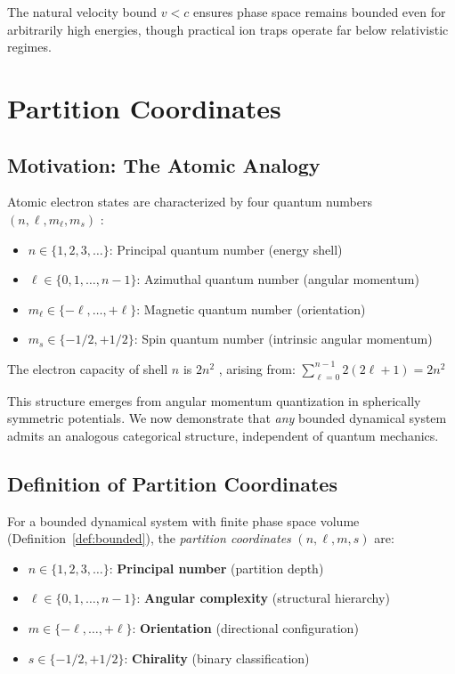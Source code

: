 The natural velocity bound $v < c$ ensures phase space remains bounded even for arbitrarily high energies, though practical ion traps operate far below relativistic regimes.

\section{Partition Coordinates}
\label{sec:coordinates}

\subsection{Motivation: The Atomic Analogy}

Atomic electron states are characterized by four quantum numbers $(n, \ell, m_\ell, m_s)$ \citep{dirac1981principles,sakurai2017modern}:
\begin{itemize}
    \item $n \in \{1, 2, 3, \ldots\}$: Principal quantum number (energy shell)
    \item $\ell \in \{0, 1, \ldots, n-1\}$: Azimuthal quantum number (angular momentum)
    \item $m_\ell \in \{-\ell, \ldots, +\ell\}$: Magnetic quantum number (orientation)
    \item $m_s \in \{-1/2, +1/2\}$: Spin quantum number (intrinsic angular momentum)
\end{itemize}

The electron capacity of shell $n$ is $2n^2$ \citep{pauli1925zusammenhang}, arising from:
$
\sum_{\ell=0}^{n-1} 2(2\ell + 1) = 2n^2
$

This structure emerges from angular momentum quantization in spherically symmetric potentials. We now demonstrate that \emph{any} bounded dynamical system admits an analogous categorical structure, independent of quantum mechanics.

\subsection{Definition of Partition Coordinates}

\begin{definition}
\label{def:partition}
For a bounded dynamical system with finite phase space volume (Definition~\ref{def:bounded}), the \emph{partition coordinates} $(n, \ell, m, s)$ are:
\begin{itemize}
    \item $n \in \{1, 2, 3, \ldots\}$: \textbf{Principal number} (partition depth)
    \item $\ell \in \{0, 1, \ldots, n-1\}$: \textbf{Angular complexity} (structural hierarchy)
    \item $m \in \{-\ell, \ldots, +\ell\}$: \textbf{Orientation} (directional configuration)
    \item $s \in \{-1/2, +1/2\}$: \textbf{Chirality} (binary classification)
\end{itemize}
\end{definition}

